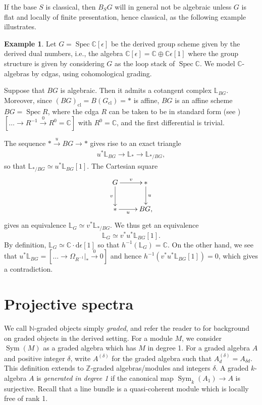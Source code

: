 \documentclass[a4paper,twoside,11pt]{amsart}
\theoremstyle{plain}
\theoremstyle{definition}
\newtheorem{example}[theorem]{Example}
\theoremstyle{remark}
\numberwithin{equation}{section}
\newcommand{\NN}{\mathbb{N}} %
\newcommand{\ZZ}{\mathbb{Z}} %
\newcommand{\CC}{\mathbb{C}} %
\DeclareMathOperator{\Sym}{Sym} %
\DeclareMathOperator{\Spec}{Spec} %
\newcommand{\cl}{\mathrm{cl}} %
\newcommand{\lr}{\longrightarrow}
\newcommand{\BL}{{\mathbb{L}}}
\begin{document}
If the base $S$ is classical, then $B_SG$ will in general not be algebraic unless $G$ is flat and locally of finite presentation, hence classical, as the following example illustrates.

\begin{example}  
Let $G = \Spec \CC[\epsilon]$ be the derived group scheme given by the derived dual numbers, i.e., the algebra $\CC[\epsilon] = \CC \oplus \CC\epsilon[1]$ where the group structure is given by considering $G$ as the loop stack of $\Spec \CC$. We model $\CC$-algebras by cdgas, using cohomological grading.

Suppose that $BG$ is algebraic. Then it admits a cotangent complex $\mathbb{L}_{BG}$. Moreover, since $(BG)_\cl = B(G_\cl) = \ast$ is affine, $BG$ is an affine scheme $BG = \Spec R$, where the cdga $R$ can be taken to be in standard form (see \cite[Def.~1.4]{HRS}) $[\ldots \to R^{-1} \xrightarrow{0} R^0=\CC]$ with $R^0 = \CC$, and the first differential is trivial.

The sequence $* \xrightarrow{u} BG \to *$ gives rise to an exact triangle
\begin{align*}
    u^\ast \BL_{BG} \lr \BL_{\ast} \lr \BL_{\ast / BG},
\end{align*}
so that $\BL_{\ast / BG} \simeq u^\ast \BL_{BG}[1]$. 
The Cartesian square
\begin{align} \label{eq:loc 4.2}
    \xymatrix{
    G \ar[r]^-{v} \ar[d]_-{v} & \ast \ar[d]^-{u} \\
    \ast \ar[r]_-{u} & BG,}
\end{align}
 gives an equivalence $\BL_G \simeq v^\ast \BL_{\ast/BG}$. We thus get an equivalence 
 \[ \BL_G \simeq v^\ast u^\ast \BL_{BG}[1]. \]
 By definition, $\BL_G \simeq \CC \cdot \mathrm{d} \epsilon [1]$ so that $h^{-1}(\BL_G) = \CC$. On the other hand, we see that $u^\ast \BL_{BG} = [ \ldots \to \Omega_{R^{-1}}|_\ast \xrightarrow{0} 0]$ and hence $h^{-1} \left( v^\ast u^\ast \BL_{BG}[1] \right) = 0$, which gives a contradiction. \smallskip
\end{example}



\appendix 

\section{Projective spectra} We call $\NN$-graded objects simply \emph{graded}, and refer the reader to \cite[\S 2]{Hekking} for background on graded objects in the derived setting. For a module $M$, we consider $\Sym(M)$ as a graded algebra which has $M$ in degree 1. For a graded algebra $A$ and positive integer $\delta$, write $A^{(\delta)}$ for the graded algebra such that $A^{(\delta)}_d = A_{\delta d}$. This definition extends to $\ZZ$-graded algebras/modules and integers $\delta$. A graded $k$-algebra $A$ is \emph{generated in degree 1} if the canonical map $\Sym_k(A_1) \to A$ is surjective. Recall that a line bundle is a quasi-coherent module which is locally free of rank 1.
\end{document}
